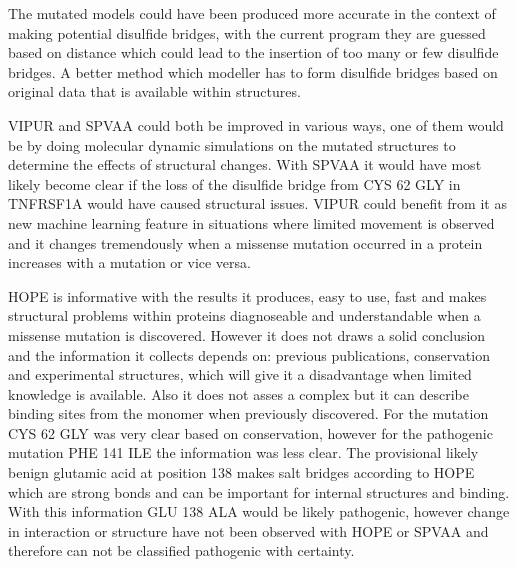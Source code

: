 The mutated models could have been produced more accurate in the context of making potential disulfide bridges, with the current program they are guessed based on distance which could lead to the insertion of too many or few disulfide bridges. A better method which modeller has to form disulfide bridges based on original data that is available within structures. 

VIPUR and SPVAA could both be improved in various ways, one of them would be by doing molecular dynamic simulations on the mutated structures to determine the effects of structural changes. With SPVAA it would have most likely become clear if the loss of the disulfide bridge from CYS 62 GLY  in TNFRSF1A would have caused structural issues. VIPUR could benefit from it as new machine learning feature in situations where limited movement is observed and it changes tremendously when a missense mutation occurred in a protein increases with a mutation or vice versa.

HOPE is informative with the results it produces, easy to use, fast and makes structural problems within proteins diagnoseable and understandable when a missense mutation is discovered. However it does not draws a solid conclusion and the information it collects depends on: previous publications, conservation and experimental structures, which will give it a disadvantage when limited knowledge is available. Also it does not asses a complex but it can describe binding sites from the monomer when previously discovered. For the mutation CYS 62 GLY was very clear based on conservation, however for the pathogenic mutation PHE 141 ILE the information was less clear. The provisional likely benign glutamic acid at position 138 makes salt bridges according to HOPE which are strong bonds and can be important for internal structures and binding. With this information GLU 138 ALA would be likely pathogenic, however change in interaction or structure have not been observed with HOPE or SPVAA and therefore can not be classified pathogenic with certainty.


